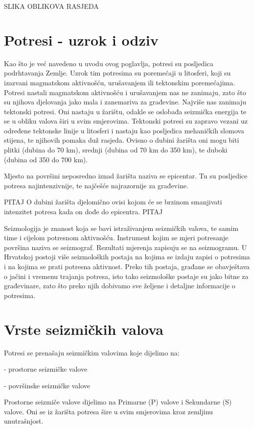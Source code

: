 \documentclass[12pt]{book}
\begin{document}
SLIKA OBLIKOVA RASJEDA

\section{Potresi - uzrok i odziv}

Kao što je već navedeno u uvodu ovog poglavlja, potresi su posljedica podrhtavanja Zemlje.  Uzrok tim potresima su poremećaji u litosferi, koji su izazvani magmatskom aktivnošću, urušavanjem ili tektonskim poremećajima. Potresi nastali magmatskom aktivnošću i urušavanjem nas ne zanimaju, zato što su njihova djelovanja jako mala i zanemariva za građevine. Najviše nas zanimaju tektonski potresi. Oni nastaju u žarištu, odakle se oslobađa seizmička energija te se u obliku valova širi u svim smjerovima. Tektonski potresi su zapravo vezani uz određene tektonske linije u litosferi i nastaju kao posljedica mehaničkih slomova stijena, te njihovih pomaka duž rasjeda. Ovisno o dubini žarišta oni mogu biti plitki (dubina do 70 km), srednji (dubina od 70 km do 350 km), te duboki (dubina od 350 do 700 km).

Mjesto na površini neposredno iznad žarišta naziva se epicentar. Tu su posljedice potresa najintenzivnije, te najčešće najrazornije za građevine. 

PITAJ O dubini žarišta djelomično ovisi kojom će se brzinom smanjivati intenzitet potresa kada on dođe do epicentra. PITAJ

Seizmologija je znanost koja se bavi istraživanjem seizmičkih valova, te samim time i cijelom potresnom aktivnošću. Instrument kojim se mjeri potresanje površina naziva se seizmograf. Rezultati mjerenja zapisuju se na seizmogramu. U Hrvatskoj postoji više seizmoloških postaja na kojima se izdaju zapisi o potresima i na kojima se prati potresna aktivnost. Preko tih postaja, građane se obavještava o jačini i vremenu trajanja potresa, isto tako seizmološke postaje su jako bitne za građevinare, zato što preko njih dobivamo sve željene i detaljne informacije o potresima.

\section{Vrste seizmičkih valova}

Potresi se prenašaju seizmičkim valovima koje dijelimo na:

- prostorne seizmičke valove

- površinske seizmičke valove

Prostorne seizmiče valove dijelimo na Primarne (P) valove i Sekundarne (S) valove. Oni se iz žarišta potresa šire u svim smjerovima kroz zemljinu unutrašnjost. 
\end{document}
